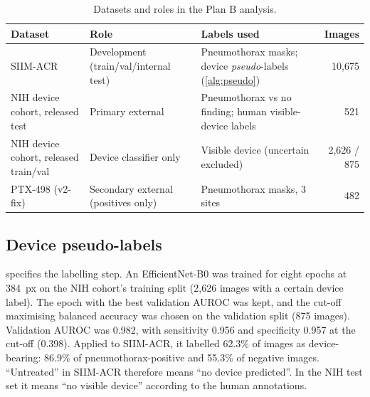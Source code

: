 \documentclass[final,3p]{elsarticle}
\begin{document}
\begin{table}[!tbp]
\centering\small
\caption{Datasets and roles in the Plan B analysis.}
\label{tab:data}
\begin{tabularx}{\linewidth}{@{}l p{3.6cm} X r@{}}
\toprule
Dataset & Role & Labels used & Images \\
\midrule
SIIM-ACR & Development (train/val/internal test) & Pneumothorax masks; device \emph{pseudo}-labels (\cref{alg:pseudo}) & 10{,}675 \\
NIH device cohort, released test & Primary external & Pneumothorax vs no finding; human visible-device labels & 521 \\
NIH device cohort, released train/val & Device classifier only & Visible device (uncertain excluded) & 2{,}626 / 875 \\
PTX-498 (v2-fix) & Secondary external (positives only) & Pneumothorax masks, 3 sites & 482 \\
\bottomrule
\end{tabularx}
\end{table}

\subsection{Device pseudo-labels}
\label{sec:pseudo}
 specifies the labelling step. An EfficientNet-B0 \citep{tan2019efficientnet} was trained for eight epochs at 384~px on the NIH cohort's training split (2{,}626 images with a certain device label). The epoch with the best validation AUROC was kept, and the cut-off maximising balanced accuracy was chosen on the validation split (875 images). Validation AUROC was 0.982, with sensitivity 0.956 and specificity 0.957 at the cut-off (0.398). Applied to SIIM-ACR, it labelled 62.3\% of images as device-bearing: 86.9\% of pneumothorax-positive and 55.3\% of negative images. ``Untreated'' in SIIM-ACR therefore means ``no device predicted''. In the NIH test set it means ``no visible device'' according to the human annotations.
\end{document}

